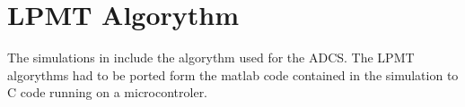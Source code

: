 \chapter{\acs{LPMT} Algorythm}

The simulations in \cite{mench11} include the algorythm used for the \ac{ADCS}. The \ac{LPMT} algorythms had to be ported form the matlab code contained in the simulation to C code running on a microcontroler. 

